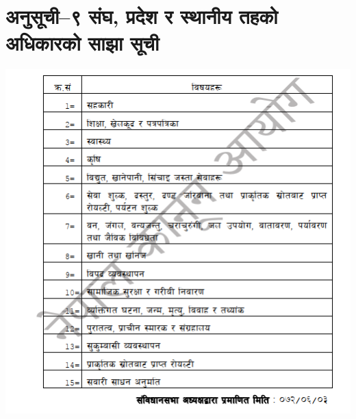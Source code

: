 \section{अनुसूची–९ संघ, प्रदेश र स्थानीय तहको अधिकारको साझा सूची}

\includegraphics[width=\textwidth]{images/44-1.png}